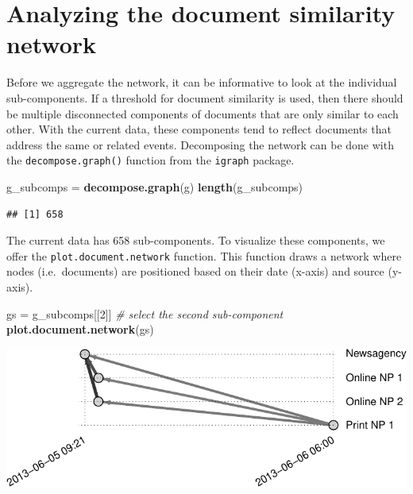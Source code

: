 \documentclass[]{article}
\newenvironment{Shaded}{\begin{snugshade}}{\end{snugshade}}
\newcommand{\KeywordTok}[1]{\textcolor[rgb]{0.13,0.29,0.53}{\textbf{{#1}}}}
\newcommand{\DecValTok}[1]{\textcolor[rgb]{0.00,0.00,0.81}{{#1}}}
\newcommand{\StringTok}[1]{\textcolor[rgb]{0.31,0.60,0.02}{{#1}}}
\newcommand{\CommentTok}[1]{\textcolor[rgb]{0.56,0.35,0.01}{\textit{{#1}}}}
\newcommand{\NormalTok}[1]{{#1}}
\begin{document}
\section{Analyzing the document similarity
network}\label{analyzing-the-document-similarity-network}

Before we aggregate the network, it can be informative to look at the
individual sub-components. If a threshold for document similarity is
used, then there should be multiple disconnected components of documents
that are only similar to each other. With the current data, these
components tend to reflect documents that address the same or related
events. Decomposing the network can be done with the
\texttt{decompose.graph()} function from the \texttt{igraph} package.

\begin{Shaded}
\begin{Highlighting}[]
\NormalTok{g_subcomps =}\StringTok{ }\KeywordTok{decompose.graph}\NormalTok{(g)}
\KeywordTok{length}\NormalTok{(g_subcomps)}
\end{Highlighting}
\end{Shaded}

\begin{verbatim}
## [1] 658
\end{verbatim}

The current data has 658 sub-components. To visualize these components,
we offer the \texttt{plot.document.network} function. This function
draws a network where nodes (i.e.~documents) are positioned based on
their date (x-axis) and source (y-axis).

\begin{Shaded}
\begin{Highlighting}[]
\NormalTok{gs =}\StringTok{ }\NormalTok{g_subcomps[[}\DecValTok{2}\NormalTok{]] }\CommentTok{# select the second sub-component}
\KeywordTok{plot.document.network}\NormalTok{(gs)}
\end{Highlighting}
\end{Shaded}

\includegraphics{vignette_files/figure-latex/unnamed-chunk-15-1.pdf}
\end{document}
